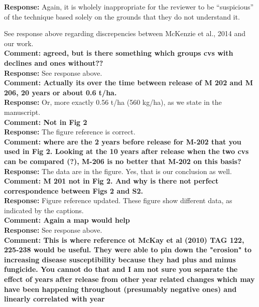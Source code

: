 \documentclass{article} \usepackage[margin=1in]{geometry}
\begin{document}
\textbf{Response: } Again, it is wholely inappropriate for the
reviewer to be ``suspicious'' of the technique based solely on the
grounds that they do not understand it.

See response above regarding discrepencies between McKenzie et al.,
2014 and our work.\\

\textbf{Comment: agreed, but is there something which groups cvs with
  declines and ones without??}\\

\textbf{Response: } See response above.\\

\textbf{Comment: Actually its over the time between release of M 202
  and M 206, 20 years or about 0.6 t/ha.}\\

\textbf{Response: } Or, more exactly 0.56 t/ha (560 kg/ha), as we
state in the manuscript.\\

\textbf{Comment: Not in Fig 2 }\\

\textbf{Response: } The figure reference is correct.\\

\textbf{Comment: where are the 2 years before release for M-202 that
  you used in Fig 2. Looking at the  10 years after release when the
  two cvs can be compared (?), M-206 is no better that M-202 on this
  basis?}\\

\textbf{Response: } The data are in the figure. Yes, that is our conclusion as well.\\

\textbf{Comment: M 201 not in Fig 2. And why is there not perfect
  correspondence between Figs 2 and S2.}\\

\textbf{Response: } Figure reference updated. These figure show
different data, as indicated by the captions.\\

\textbf{Comment: Again a map would help}\\

\textbf{Response: } See response above.\\

\textbf{Comment: This is where reference ot McKay et al (2010) TAG
  122, 225-238 would be useful. They were able to pin down the
  "erosion" to increasing disease susceptibility because they had plus
  and minus fungicide. You cannot do that and I am not sure you
  separate the effect of years after release from other year related
  changes which may have been happening throughout (presumably
  negative ones) and linearly correlated with year} \\
\end{document}
